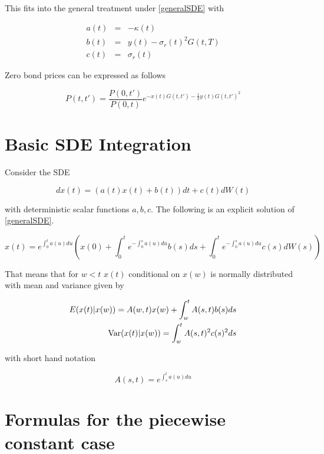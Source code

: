 \documentclass{amsart}
\theoremstyle{plain}
\numberwithin{equation}{section}
\begin{document}
This fits into the general treatment under \ref{generalSDE} with

\begin{eqnarray}
a(t) &=& -\kappa(t) \\
b(t) &=& y(t)-\sigma_r(t)^2G(t,T) \\
c(t) &=& \sigma_r(t)
\end{eqnarray}

Zero bond prices can be expressed as follows

\begin{equation}
P(t,t') = \frac{P(0,t')}{P(0,t)} e^{-x(t)G(t,t')-\frac{1}{2}y(t)G(t,t')^2}
\end{equation}

\section{Basic SDE Integration}
Consider the SDE

\begin{equation}\label{generalSDE}
dx(t) = (a(t)x(t) + b(t)) dt + c(t) dW(t)
\end{equation}

with deterministic scalar functions $a, b, c$. The following is an explicit solution of \ref{generalSDE}.

\begin{equation}
x(t) = e^{\int_0^t a(u) du} \left( x(0)  + \int_0^t e^{-\int_0^s a(u) du} b(s) ds + \int_0^t e^{-\int_0^s a(u) du} c(s) dW(s) \right)
\end{equation}

That means that for $w<t$ $x(t)$ conditional on $x(w)$ is normally distributed with mean and variance given by

\begin{eqnarray}\label{condExpectationVariance}
E(x(t) | x(w)) = A(w,t) x(w) + \int_{w}^t A(s,t) b(s) ds  \\
\textnormal{Var}(x(t) | x(w)) = \int_{w}^t A(s,t)^{2} c(s)^2 ds
\end{eqnarray}

with short hand notation

\begin{equation}
A(s,t) = e^{\int_s^t a(u) du}
\end{equation}

\section{Formulas for the piecewise constant case}
\end{document}
